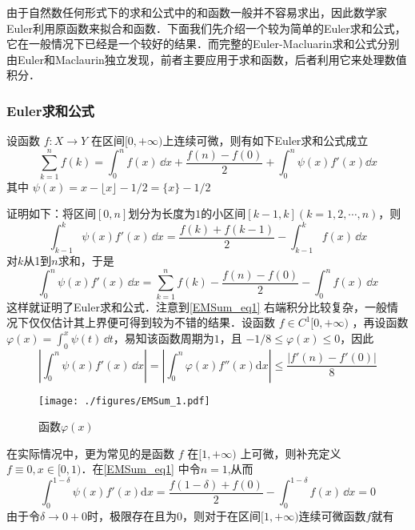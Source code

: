 
由于自然数任何形式下的求和公式中的和函数一般并不容易求出，因此数学家Euler利用原函数来拟合和函数．下面我们先介绍一个较为简单的Euler求和公式，它在一般情况下已经是一个较好的结果．而完整的Euler-Macluarin求和公式分别由Euler和Maclaurin独立发现，前者主要应用于求和函数，后者利用它来处理数值积分．

\subsubsection{Euler求和公式}

\begin{theorem}{}
设函数 $f:X\to Y$ 在区间$[0,+\infty)$上连续可微，则有如下Euler求和公式成立	
        \begin{equation}\label{EMSum_eq1} 
            \sum_{k=1}^{n}f(k)=\int_{0}^{n}f(x)\,\dd x
            +\frac{f(n)-f(0)}{2}+\int_{0}^{n}\psi(x)f'(x)\dd x
        \end{equation}
    其中 $\psi(x)=x-\lfloor x \rfloor-1/2=\{x\}-1/2$
\end{theorem}
证明如下：将区间$[0,n]$划分为长度为$1$的小区间$[k-1,k](k=1,2,\cdots,n)$，则
​\[
    \int_{k-1}^{k}\psi(x)f'(x)\,\dd x
    =\frac{f(k)+f(k-1)}{2}-\int_{k-1}^{k}f(x)\,\dd x
\]
​对$k$从1到$n$求和，于是
​\[
    \int_{0}^{n}\psi(x)f'(x)\,\dd x
    =\sum_{k=1}^{n}f(k)-\frac{f(n)-f(0)}{2}-\int_{0}^{n}f(x)\,\dd x
\]
这样就证明了Euler求和公式．注意到\autoref{EMSum_eq1}  右端积分比较复杂，一般情况下仅仅估计其上界便可得到较为不错的结果．设函数 $f\in{C^1[0,+\infty)}$ ，再设函数$\varphi(x)=\displaystyle{\int_{0}^{x}\psi(t)\,\dd t}$，易知该函数周期为$1$，且
 $-1/8\leqslant\varphi(x)\leqslant 0$，因此
\[
    \left|\int_{0}^{n}\psi(x)f'(x)\,\dd x\right|
    =\left|\int_{0}^{n}\varphi(x)f''(x)\mathrm{d}x\right|
    \leqslant\frac{|f'(n)-f'(0)|}{8}
\]
\begin{figure}[ht]
\centering
\texttt{[image: ./figures/EMSum\_1.pdf]}
\caption{函数$\varphi(x)$} \label{EMSum_fig1}
\end{figure}
在实际情况中，更为常见的是函数 $f$ 在$[1,+\infty)$ 上可微，则补充定义$ f\equiv 0,x\in[0,1)$．在\autoref{EMSum_eq1}  中令$n=1$,从而
\[
    \int_{0}^{1-\delta}\psi(x)f'(x)\mathrm{d}x
    =\frac{f(1-\delta)+f(0)}{2}-\int_{0}^{1-\delta}f(x)\,\dd x=0
\]
由于令$\delta\to0+0$时，极限存在且为$0$，则对于在区间$[1,+\infty)$连续可微函数$f$就有
